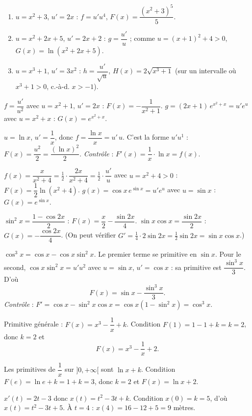 \begin{enumerate}[label=\alph*)]
\item $u=x^{2}+3$, $u'=2x$ : $f=u'u^{4}$, $F(x)=\dfrac{(x^{2}+3)^{5}}{5}$.
\item $u=x^{2}+2x+5$, $u'=2x+2$ : $g=\dfrac{u'}{u}$ ; comme $u=(x+1)^{2}+4>0$,
$G(x)=\ln(x^{2}+2x+5)$.
\item $u=x^{3}+1$, $u'=3x^{2}$ : $h=\dfrac{u'}{\sqrt u}$, $H(x)=2\sqrt{x^{3}+1}$
(sur un intervalle où $x^{3}+1>0$, c.-à-d. $x>-1$).
\end{enumerate}

$f=\dfrac{u'}{u^{2}}$ avec $u=x^{2}+1$, $u'=2x$ : $F(x)=-\dfrac1{x^{2}+1}$.
$g=(2x+1)\,e^{x^{2}+x}=u'e^{u}$ avec $u=x^{2}+x$ : $G(x)=e^{x^{2}+x}$.

$u=\ln x$, $u'=\dfrac1x$, donc $f=\dfrac{\ln x}{x}=u'\,u$. C'est la forme $u'u^{1}$ :
$F(x)=\dfrac{u^{2}}{2}=\dfrac{(\ln x)^{2}}{2}$.
\emph{Contrôle} : $F'(x)=\dfrac1x\cdot\ln x=f(x)$. \checkmark

$f(x)=\dfrac{x}{x^{2}+4}=\tfrac12\cdot\dfrac{2x}{x^{2}+4}=\tfrac12\cdot\dfrac{u'}{u}$ avec
$u=x^{2}+4>0$ : $F(x)=\dfrac12\ln(x^{2}+4)$.
$g(x)=\cos x\,e^{\sin x}=u'e^{u}$ avec $u=\sin x$ : $G(x)=e^{\sin x}$.

$\sin^{2}x=\dfrac{1-\cos2x}{2}$ : $F(x)=\dfrac x2-\dfrac{\sin2x}{4}$.
$\sin x\cos x=\dfrac{\sin2x}{2}$ : $G(x)=-\dfrac{\cos2x}{4}$.
(On peut vérifier $G'=\tfrac14\cdot2\sin2x=\tfrac12\sin2x=\sin x\cos x$.) \checkmark

$\cos^{3}x=\cos x-\cos x\sin^{2}x$. Le premier terme se primitive en $\sin x$.
Pour le second, $\cos x\sin^{2}x=u'u^{2}$ avec $u=\sin x$, $u'=\cos x$ : sa primitive est
$\dfrac{\sin^{3}x}{3}$. D'où
\[
F(x)=\sin x-\frac{\sin^{3}x}{3}.
\]
\emph{Contrôle} : $F'=\cos x-\sin^{2}x\cos x=\cos x(1-\sin^{2}x)=\cos^{3}x$. \checkmark

Primitive générale : $F(x)=x^{3}-\dfrac1x+k$. Condition $F(1)=1-1+k=k=2$, donc $k=2$ et
\[
F(x)=x^{3}-\frac1x+2.
\]

Les primitives de $\dfrac1x$ sur $]0,+\infty[$ sont $\ln x+k$. Condition $F(e)=\ln e+k=1+k=3$,
donc $k=2$ et $F(x)=\ln x+2$.

$x'(t)=2t-3$ donc $x(t)=t^{2}-3t+k$. Condition $x(0)=k=5$, d'où $x(t)=t^{2}-3t+5$.
À $t=4$ : $x(4)=16-12+5=9$ mètres.

